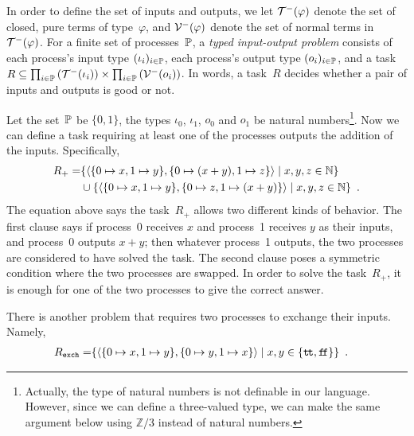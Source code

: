 \newcommand{\true}{\texttt{t\kern -1.2pt t}}
\newcommand{\false}{\texttt{f\kern -1.7pt f}}
In order to define the set of inputs and outputs, we let
$\mathcal{T}^-(\varphi)$ denote the set of closed, pure terms of
type~$\varphi$,
and $\mathcal{V}^-(\varphi)$ denote the set of normal terms in $\mathcal{T}^-(\varphi)$.
For a finite set of processes~$\mathbb{P}$,
a \textit{typed input-output problem} consists
of each process's input type
$(\iota_i)_{i\in \mathbb{P}}$, each process's output type $(o_i)_{i\in
\mathbb{P}}$, and a
task $R\subseteq \prod_{i\in \mathbb{P}}\left(\mathcal{T}^-(\iota_i)\right)\times
 \prod_{i\in \mathbb{P}}\left(\mathcal{V}^-(o_i)\right)$.
 In words, a task~$R$ decides whether a pair of inputs and outputs is
 good or not.

 \begin{example}
  \label{ex:xor}
  Let the set~$\mathbb{P}$ be $\{0,1\}$,
  the types $\iota_0$, $\iota_1$, $o_0$ and $o_1$ be
  natural numbers\footnote{Actually, the type of natural numbers is not
  definable in our language.
  However, since we can define a three-valued type, we can make the same
  argument below using $\mathbb{Z}/3$ instead of natural numbers.
  }.
  Now we can define a task requiring at least one of the processes outputs
  the addition of the inputs.  Specifically,
  \begin{align*}
   R_{+} =&
   \{\langle{\{0\mapsto x, 1\mapsto y\},\{0\mapsto (x + y), 1\mapsto z\}}\rangle\mid
   x,y,z\in\mathbb{N}\}
   \\ & \cup \{\langle{\{0\mapsto x, 1\mapsto y\},\{0\mapsto z, 1\mapsto
   (x + y)\}}\rangle\mid
   x,y,z\in\mathbb{N}\}\enspace.
  \end{align*}
  The equation above says the task~$R_{+}$ allows two different kinds of
  behavior.  The first clause says if process~0 receives $x$ and
  process~1 receives $y$ as their inputs, and process~0 outputs $x +
  y$; then whatever process~1 outputs, the two processes are considered
  to have solved the task.  The second clause poses a symmetric
  condition where the two processes are swapped.
  In order to solve the task~$R_{+}$,
  it is enough for one of the two processes to give the correct answer.
 \end{example}
 \begin{example}
  \label{ex:exchange}
  There is another problem that requires
  two processes to exchange their inputs.  Namely,
 \begin{align*}
  R_{\mathtt{exch}} =&
  \{\tuple{\{0\mapsto x, 1\mapsto y\},\{0\mapsto y, 1\mapsto x\}}\mid
  x,y\in\{\true,\false\}\}\enspace.
 \end{align*}
 \end{example}

